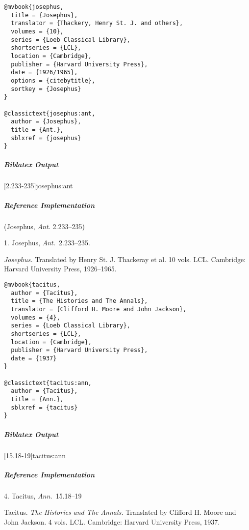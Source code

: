 \documentclass[a4paper]{article}
\newenvironment{biboutput}{%
  \subparagraph{Biblatex Output}
}{\color{black}}
\newenvironment{refimp}{%
  \subparagraph{Reference Implementation}
  \color{reference-colour}
  \rm
}{\par\color{black}}
\begin{document}
\begin{lstlisting}
@mvbook{josephus,
  title = {Josephus},
  translator = {Thackery, Henry St. J. and others},
  volumes = {10},
  series = {Loeb Classical Library},
  shortseries = {LCL},
  location = {Cambridge},
  publisher = {Harvard University Press},
  date = {1926/1965},
  options = {citebytitle},
  sortkey = {Josephus}
}

@classictext{josephus:ant,
  author = {Josephus},
  title = {Ant.},
  sblxref = {josephus}
}
\end{lstlisting}

\begin{biboutput}
  [2.233-235]{josephus:ant}
\end{biboutput}

\begin{refimp}
  (Josephus, \emph{Ant.} 2.233–235)

  1. Josephus, \emph{Ant.}\ 2.233–235.

  \hangindent\bibindent \emph{Josephus.} Translated by Henry St. J. Thackeray
  et al. 10 vols. LCL. Cambridge: Harvard University Press, 1926–1965.

\end{refimp}

\medskip

\begin{lstlisting}
@mvbook{tacitus,
  author = {Tacitus},
  title = {The Histories and The Annals},
  translator = {Clifford H. Moore and John Jackson},
  volumes = {4},
  series = {Loeb Classical Library},
  shortseries = {LCL},
  location = {Cambridge},
  publisher = {Harvard University Press},
  date = {1937}
}

@classictext{tacitus:ann,
  author = {Tacitus},
  title = {Ann.},
  sblxref = {tacitus}
}
\end{lstlisting}

\begin{biboutput}
  [15.18-19]{tacitus:ann}
\end{biboutput}

\begin{refimp}
  4. Tacitus, \emph{Ann.}\ 15.18–19

  \hangindent\bibindent Tacitus. \emph{The Histories and The Annals.}
  Translated by Clifford H. Moore and John Jackson. 4 vols. LCL. Cambridge:
  Harvard University Press, 1937.

\end{refimp}
\end{document}
